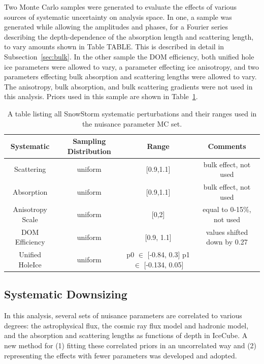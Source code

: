 \documentclass[main.tex]{subfiles}
\begin{document}
Two Monte Carlo samples were generated to evaluate the effects of various sources of systematic uncertainty on analysis space. 
In one, a sample was generated while allowing the amplitudes and phases, for a Fourier series describing the depth-dependence of the absorption length and scattering length, to vary amounts shown in Table TABLE. 
This is described in detail in Subsection~\ref{sec:bulk}.
In the other sample the DOM efficiency, both unified hole ice parameters were allowed to vary, a parameter effecting ice anisotropy, and two parameters effecting bulk absorption and scattering lengths were allowed to vary. The anisotropy, bulk absorption, and bulk scattering gradients were not used in this analysis. 
Priors used in this sample are shown in Table~\ref{table:snowstorm2}. 

\begin{table}
    \centering
    \begin{tabular}{c | ccc}\rowcolor{blue!25}
        Systematic & Sampling Distribution & Range & Comments \\\hline
        Scattering & uniform & [0.9,1.1] & bulk effect, not used\\
        Absorption & uniform & [0.9,1.1] & bulk effect, not used\\
        Anisotropy Scale & uniform & [0,2] & equal to 0-15\%, not used \\
        DOM Efficiency & uniform & [0.9, 1.1] & values shifted down by 0.27 \\
        Unified HoleIce & uniform & \shortstack{p0 $\in$ [-0.84, 0.3] \\ p1 $\in$ [-0.134, 0.05]} & 
    \end{tabular}
    \caption{A table listing all SnowStorm systematic perturbations and their ranges used in the nuisance parameter MC set.}\label{table:snowstorm2}
\end{table}

\subsection{Systematic Downsizing}\label{sect:down}

In this analysis, several sets of nuisance parameters are correlated to various degrees: the astrophysical flux, the cosmic ray flux model and hadronic model, and the absorption and scattering lengths as functions of depth in IceCube. 
A new method for (1) fitting these correlated priors in an uncorrelated way and (2) representing the effects with fewer parameters was developed and adopted. 
\end{document}

